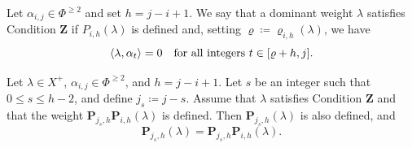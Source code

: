 







\begin{definition}\rm
Let $\alpha_{i,j} \in \Phi^{\geq 2}$ and set $h = j-i+1$. We say that a dominant weight $\lambda$ satisfies Condition $\mathbf{Z}$ if $P_{i,h}(\lambda)$ is defined and, setting $\varrho \coloneq \varrho_{i,h}(\lambda)$, we have
$$ \langle \lambda , \alpha_t \rangle = 0 \quad \text{for all integers } t \in [\varrho+h, j]. $$
\end{definition}



\begin{lemma}\label{lem: super-conmutation}
Let $\lambda \in X^+$, $\alpha_{i,j}\in \Phi^{\geq 2}$, and  $h=j-i+1$. 
Let $s$ be an integer such that $0\leq s\leq h-2$, and define $j_s\coloneqq j-s$. 
Assume that $\lambda$ satisfies Condition $\mathbf{Z}$ and that the weight
$\mathbf{P}_{j_s,h}\mathbf{P}_{i,h}(\lambda)$ is defined.
Then $\mathbf{P}_{j_s,h}(\lambda)$ is also defined, and
\begin{equation}\label{eq: super-commutation}
    \mathbf{P}_{j_s,h}(\lambda)
    =
    \mathbf{P}_{j_s,h}\mathbf{P}_{i,h}(\lambda).
\end{equation}
\end{lemma}


